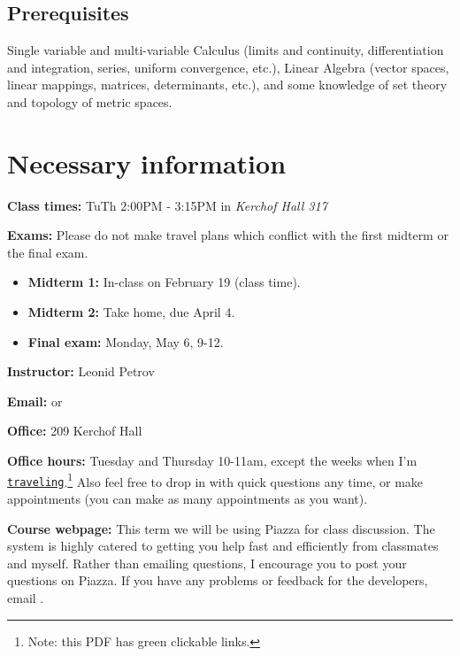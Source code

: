 \documentclass[oneside,11pt]{amsart}
\begin{document}
\subsection*{Prerequisites}

Single variable and multi-variable Calculus (limits and continuity,
differentiation and integration, series, uniform convergence, etc.), Linear
Algebra (vector spaces, linear mappings, matrices, determinants, etc.), and
some knowledge of set theory and topology of metric spaces. 


\section{Necessary information}
\bigskip

	\textbf{Class times:}   TuTh 2:00PM - 3:15PM in
	\emph{Kerchof Hall 317}

\medskip


\textbf{Exams:} Please do not make travel plans which conflict 
with the first midterm or the final exam.
\begin{itemize}
	\item \textbf{Midterm 1:} In-class on February 19 (class time).
	\item \textbf{Midterm 2:} Take home, due April 4.
	\item \textbf{Final exam:} Monday, May 6, 9-12.
\end{itemize}

\medskip

\textbf{Instructor:} Leonid Petrov
\medskip

\textbf{Email:}  or 
\medskip

\textbf{Office:} 209 Kerchof Hall
\medskip

\textbf{Office hours:} 
Tuesday and Thursday 10-11am, except the weeks when I'm \href{https://lpetrov.cc/2018/05/travel-2019/}{\texttt{traveling}}.\footnote{Note:
this PDF has green clickable links.}
Also feel free to drop in with quick questions any time, or make 
appointments 
(you can make as many appointments as you want).

\medskip

\textbf{Course webpage:} 
This term we will be using Piazza for class discussion. The system is highly catered to getting you help fast and efficiently from classmates and myself. Rather than emailing questions, I encourage you to post your questions on Piazza. If you have any problems or feedback for the developers, email .
\end{document}
